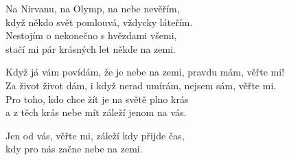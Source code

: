 \vspace{10pt}

\nv{}Na Nirvanu, na Olymp, na nebe nevěřím,\\
když někdo svět pomlouvá, vždycky láteřím.\\
Nestojím o nekonečno s hvězdami všemi,\\
stačí mi pár krásných let někde na zemi.
\vnv

\nv{}Když já vám povídám, že je nebe na zemi, pravdu mám, věřte mi!\\
Za život život dám, i když nerad umírám, nejsem sám, věřte mi.\\
\nv Pro toho, kdo chce  \sm žít je na světě plno krás\\
a z těch krás nebe mít záleží jenom na vás.
\vnv

\nv{}Jen od vás, věřte mi, záleží kdy přijde čas,\\
kdy pro nás začne nebe na zemi.
\newpage
